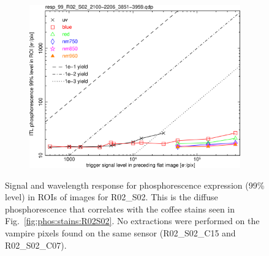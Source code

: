 \begin{figure}[!htbp]
\centering
\begin{subfigure}{0.45\textwidth}    
  \centering
  \includegraphics[width=\textwidth]{figures/phosphorescence-survey/phos_resp/resp_99_R02_S02_2100-2206_3851-3959.png}    
\end{subfigure}
\newline
\caption{Signal and wavelength response for phosphorescence expression (99\% level) in ROIs of images for R02\_S02. This is the diffuse phosphorescence that correlates with the coffee stains seen in Fig.~\ref{fig:phos:stains:R02S02}. No extractions were performed on the vampire pixels found on the same sensor (R02\_S02\_C15 and R02\_S02\_C07).}
\label{fig:phos:resp:R02S02}
\end{figure}

